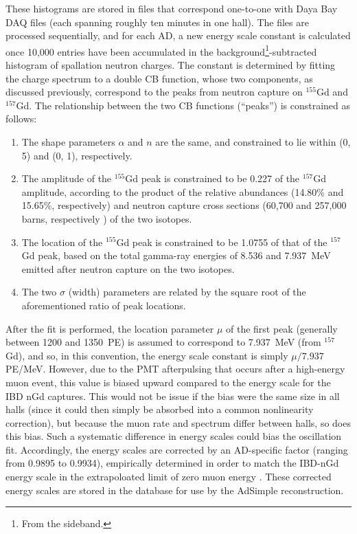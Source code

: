 \documentclass[../thesis.tex]{subfiles}
\begin{document}
\begin{comment}
  Note: For AdSimpleNL, in reconstruction, a (AD-specific?) scale constant is applied to the non-NL energy scale constant. See line 209 of QsumEnergyTool.cc. Discuss this?
\end{comment}

These histograms are stored in files that correspond one-to-one with Daya Bay DAQ files (each spanning roughly ten minutes in one hall). The files are processed sequentially, and for each AD, a new energy scale constant is calculated once 10,000 entries have been accumulated in the background\footnote{From the sideband.}-subtracted histogram of spallation neutron charges. The constant is determined by fitting the charge spectrum to a double CB function, whose two components, as discussed previously, correspond to the peaks from neutron capture on $^{155}$Gd and $^{157}$Gd. The relationship between the two CB functions (``peaks'') is constrained as follows:

\begin{enumerate}
\item The shape parameters $\alpha$ and $n$ are the same, and constrained to lie within (0, 5) and (0, 1), respectively.
\item The amplitude of the $^{155}$Gd peak is constrained to be 0.227 of the $^{157}$Gd amplitude, according to the product of the relative abundances (14.80\% and 15.65\%, respectively) and neutron capture cross sections (60,700 and 257,000 barns, respectively \cite{doi:10.13182/NSE05-64}) of the two isotopes.
\item The location of the $^{155}$Gd peak is constrained to be 1.0755 of that of the $^{157}$Gd peak, based on the total gamma-ray energies of 8.536 and 7.937~MeV emitted after neutron capture on the two isotopes.
\item The two $\sigma$ (width) parameters are related by the square root of the aforementioned ratio of peak locations.
\end{enumerate}

After the fit is performed, the location parameter $\mu$ of the first peak (generally between 1200 and 1350~PE) is assumed to correspond to 7.937~MeV (from $^{157}$Gd), and so, in this convention, the energy scale constant is simply $\mu/7.937$ PE/MeV. However, due to the PMT afterpulsing that occurs after a high-energy muon event, this value is biased upward compared to the energy scale for the IBD nGd captures. This would not be issue if the bias were the same size in all halls (since it could then simply be absorbed into a common nonlinearity correction), but because the muon rate and spectrum differ between halls, so does this bias. Such a systematic difference in energy scales could bias the oscillation fit. Accordingly, the energy scales are corrected by an AD-specific factor (ranging from 0.9895 to 0.9934), empirically determined in order to match the IBD-nGd energy scale in the extrapoloated limit of zero muon energy \cite{spallScaleCorr}. These corrected energy scales are stored in the database for use by the AdSimple reconstruction.
\end{document}
